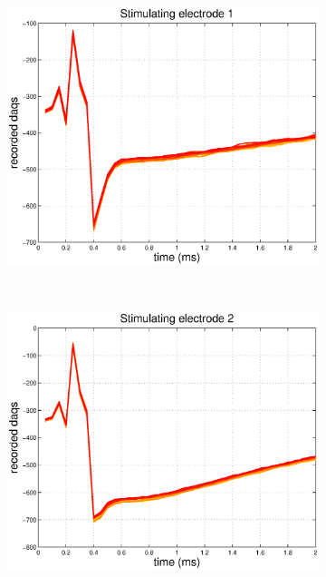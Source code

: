 \documentclass[12pt,letterpaper,fleqn]{article}
\begin{document}
\begin{figure}[ht!]
        \centering
        \begin{subfigure}[b]{0.32\textwidth}
                \includegraphics[width=\textwidth]{ArtTraceS1.eps}
                \caption{}
        \end{subfigure}%
~\begin{subfigure}[b]{0.32\textwidth}
                \includegraphics[width=\textwidth]{ArtTraceS2.eps}
                \caption{}
        \end{subfigure}
      ~  \begin{subfigure}[b]{0.32\textwidth}

\end{subfigure}
\end{figure}
\end{document}
